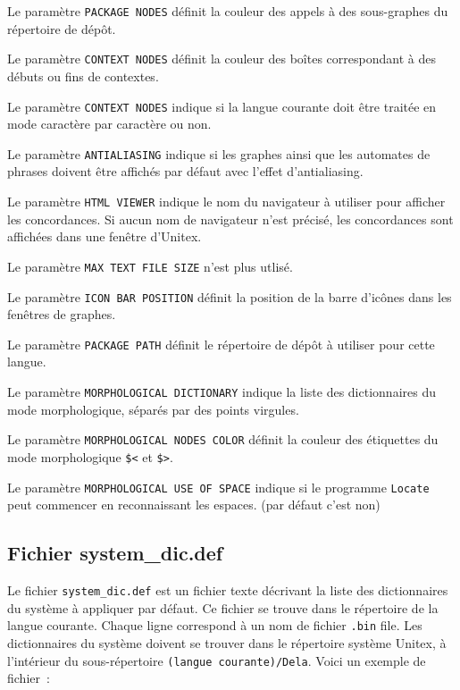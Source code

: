 \bigskip
\noindent Le paramètre \verb+PACKAGE NODES+ définit la couleur des appels à des sous-graphes du
répertoire de dépôt.

\bigskip
\noindent Le paramètre \verb+CONTEXT NODES+ définit la couleur des boîtes correspondant à des débuts
ou fins de contextes.

\bigskip
\noindent Le paramètre \verb+CONTEXT NODES+ indique si la langue courante doit être traitée en mode
caractère par caractère ou non.

\bigskip
\noindent Le paramètre \verb+ANTIALIASING+ indique si les graphes ainsi que les automates de phrases
doivent être affichés par défaut avec l’effet d’antialiasing.

\bigskip
\noindent Le paramètre \verb+HTML VIEWER+ indique le nom du navigateur à utiliser pour afficher les
concordances. Si aucun nom de navigateur n’est précisé, les concordances sont affichées
dans une fenêtre d’Unitex.

\bigskip
\noindent Le paramètre \verb+MAX TEXT FILE SIZE+ n'est plus utlisé.

\bigskip
\noindent Le paramètre \verb+ICON BAR POSITION+ définit la position de la barre d’icônes dans les fenêtres de graphes.


\bigskip
\noindent Le paramètre \verb+PACKAGE PATH+ définit le répertoire de dépôt à utiliser pour cette langue.

\bigskip
\noindent Le paramètre \verb+MORPHOLOGICAL DICTIONARY+ indique la liste des dictionnaires du mode morphologique, séparés par des points virgules.

\bigskip
\noindent Le paramètre \verb+MORPHOLOGICAL NODES COLOR+ définit la couleur des étiquettes du mode morphologique \verb+$<+ et \verb+$>+.

\bigskip
\noindent Le paramètre \verb+MORPHOLOGICAL USE OF SPACE+ indique si le programme
\verb+Locate+ peut commencer en reconnaissant les espaces. (par défaut c'est non)


\subsection{Fichier system\_dic.def}
Le fichier \verb+system_dic.def+ est un fichier texte décrivant la liste des dictionnaires du
système à appliquer par défaut. Ce fichier se trouve dans le répertoire de la langue courante.
Chaque ligne correspond à un nom de fichier \verb+.bin+ file.
Les dictionnaires du système doivent se trouver dans le
répertoire système Unitex,
à l’intérieur du sous-répertoire \verb+(langue courante)/Dela+.
Voici un exemple de fichier~:



